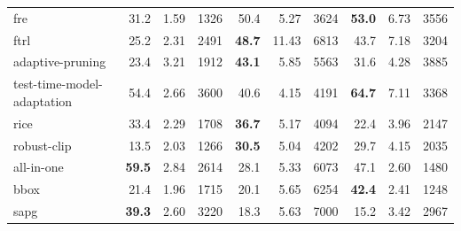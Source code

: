 \documentclass{article}
\begin{document}
\begin{table}[h]
{\begin{tabular}{l rrr rrr rrr}
    fre                                                & 31.2 & 1.59 & 1326 & 50.4 & 5.27 & 3624 & \textbf{53.0} & 6.73 & 3556 \\
    ftrl                                               & 25.2 & 2.31 & 2491 & \textbf{48.7} & 11.43 & 6813 & 43.7 & 7.18 & 3204 \\
    adaptive-pruning                                   & 23.4 & 3.21 & 1912 & \textbf{43.1} & 5.85 & 5563 & 31.6 & 4.28 & 3885 \\
    test-time-model-adaptation                         & 54.4 & 2.66 & 3600 & 40.6 & 4.15 & 4191 & \textbf{64.7} & 7.11 & 3368 \\
    rice                                               & 33.4 & 2.29 & 1708 & \textbf{36.7} & 5.17 & 4094 & 22.4 & 3.96 & 2147 \\
    robust-clip                                        & 13.5 & 2.03 & 1266 & \textbf{30.5} & 5.04 & 4202 & 29.7 & 4.15 & 2035 \\
    all-in-one                                         & \textbf{59.5} & 2.84 & 2614 & 28.1 & 5.33 & 6073 & 47.1 & 2.60 & 1480 \\
    bbox                                               & 21.4 & 1.96 & 1715 & 20.1 & 5.65 & 6254 & \textbf{42.4} & 2.41 & 1248 \\
    sapg                                               & \textbf{39.3} & 2.60 & 3220 & 18.3 & 5.63 & 7000 & 15.2 & 3.42 & 2967 \\
    \bottomrule
  \end{tabular}}
\end{table}
\end{document}
